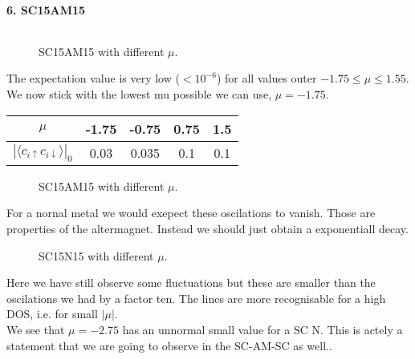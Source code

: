 \documentclass[../main.tex]{subfiles}
\begin{document}
\paragraph{6. SC15AM15}$~$\\
\begin{figure}[H]
    \centering
    
    \caption{SC15AM15 with different $\mu$.}
\end{figure}
The expectation value is very low ($<10^{-6}$) for all values outer $-1.75\le\mu\le1.55$.
We now stick with the lowest mu possible we can use, $\mu = -1.75$.
\begin{table}[H]
    \centering
    \begin{tabular}{c|c|c|c|c}
        $\mu$          & -1.75 & -0.75 & 0.75 & 1.5 \\\hline\hline
         $|\langle c_{i\uparrow}c_{i\downarrow}\rangle|_0$  & 0.03  & 0.035 &  0.1  & 0.1
    \end{tabular}
\end{table}

\begin{figure}[H]
    \centering
    
    \caption{SC15AM15 with different $\mu$.}
\end{figure}

For a nornal metal we would exepect these oscilations to vanish. Those are properties of the altermagnet. Instead we should just obtain a exponentiall decay.
\begin{figure}[H]
    \centering
    
    \caption{SC15N15 with different $\mu$.}
    \label{fig:SC15N15}
\end{figure}
Here we have still observe some fluctuations but these are smaller than the oscilations we had by a factor ten. The lines are more recognisable for a high DOS, i.e. for small $|\mu|$.\\
We see that $\mu = -2.75$ has an unnormal small value for a SC N. This is actely a statement that we are going to observe  in the SC-AM-SC as well..
\end{document}
